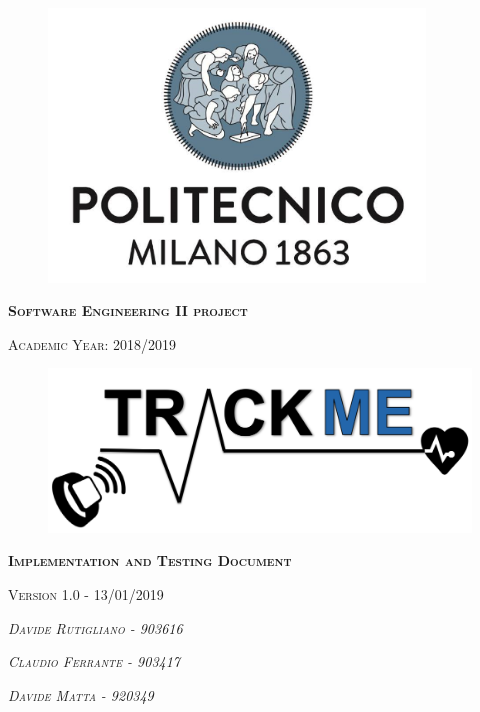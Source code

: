 \thispagestyle{empty}
\begin{figure}[!h]
	\centering
	\includegraphics[width=100mm]{Images/poli-logo.png}
\end{figure}
\hfill
\begin{center}
    \fontsize{18px}{6mm}\selectfont \textsc{\textbf{Software Engineering II project}}
\end{center}
\begin{center}
    \fontsize{12px}{4mm}\selectfont \textsc{Academic Year: 2018/2019}
\end{center}
\hfill
\hfill
\begin{figure}[!h]
	\centering
	\includegraphics[width=120mm]{Images/trackme-logo.png}
\end{figure}
\hfill
\hfill
\begin{center}
    \fontsize{22px}{8mm}\selectfont \textsc{\textbf{Implementation and Testing Document}}
\end{center}
\begin{center}
    \fontsize{14px}{4mm}\selectfont \textsc{{Version 1.0 - 13/01/2019}}
\end{center}
\hfill
\hfill
\begin{center}
\fontsize{14px}{4mm}\selectfont \textsc{\textit{Davide Rutigliano -  903616}}
\end{center}

\begin{center}
\fontsize{14px}{4mm}\selectfont \textsc{\textit{Claudio Ferrante - 903417\\}}
\end{center}

\begin{center}
\fontsize{14px}{4mm}\selectfont \textsc{\textit{Davide Matta - 920349}}
\end{center}